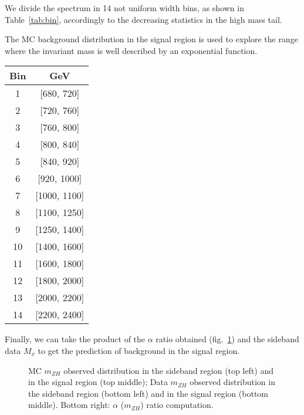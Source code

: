 \documentclass[12pt]{article} %
\begin{document}
We divide the spectrum in 14 not uniform width bins, as shown in Table~\ref{tab:bin}, accordingly to the decreasing statistics in the high mass tail.

The MC background distribution in the signal region is used to explore the range where the invariant mass is well described by an exponential function.

\begin{center}
  \begin{tabular}{ c | c }
    \hline
    \bf Bin & \bf GeV \\
    \hline
    \hline
    1 & [680, 720] \\
    2 & [720, 760] \\
    3 & [760, 800] \\
    4 & [800, 840] \\
    5 & [840, 920] \\
    6 & [920, 1000] \\
    7 & [1000, 1100] \\
    8 & [1100, 1250] \\
    9 & [1250, 1400] \\
    10 & [1400, 1600] \\
    11 & [1600, 1800] \\
    12 & [1800, 2000] \\
    13 & [2000, 2200] \\
    14 & [2200, 2400] \\
    \hline
  \end{tabular}
  \label{tab:bin}
\end{center}

Finally, we can take the product of the $\alpha$ ratio obtained (fig.~\ref{fig:alpha}) and the sideband data $M_x$ to get the prediction of background in the signal region.

\begin{figure}[H] %
  \caption{MC $m_{ZH}$ observed distribution in the sideband region (top left) and in the signal region (top middle); Data $m_{ZH}$ observed distribution in the sideband region (bottom left) and in the signal region (bottom middle). Bottom right: $\alpha$ ($m_{ZH}$) ratio computation.}
  \label{fig:alpha}
\end{figure}


\newpage


\end{document}
